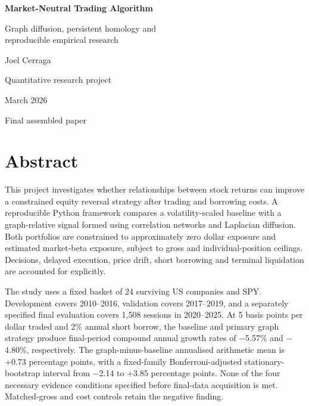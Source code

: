 \documentclass[12pt,a4paper,oneside]{article}
\begin{document}
\begin{titlepage}
\thispagestyle{empty}
\centering
\vspace*{28mm}
{\fontsize{24}{29}\selectfont\bfseries Market-Neutral Trading Algorithm\par}
\vspace{10mm}
{\fontsize{14}{19}\selectfont Graph diffusion, persistent homology and\\reproducible empirical research\par}
\vspace{24mm}
{\fontsize{12}{17}\selectfont Joel Cerraga\par}
\vspace{6mm}
{\fontsize{12}{17}\selectfont Quantitative research project\par}
\vspace{6mm}
{\fontsize{12}{17}\selectfont March 2026\par}
\vspace{6mm}
{\fontsize{11}{15}\selectfont Final assembled paper\par}
\vfill
\end{titlepage}
\thispagestyle{plain}
\section*{Abstract}
This project investigates whether relationships between stock returns can improve a constrained equity reversal strategy after trading and borrowing costs. A reproducible Python framework compares a volatility-scaled baseline with a graph-relative signal formed using correlation networks and Laplacian diffusion. Both portfolios are constrained to approximately zero dollar exposure and estimated market-beta exposure, subject to gross and individual-position ceilings. Decisions, delayed execution, price drift, short borrowing and terminal liquidation are accounted for explicitly.

The study uses a fixed basket of 24 surviving US companies and SPY. Development covers 2010–2016, validation covers 2017–2019, and a separately specified final evaluation covers 1,508 sessions in 2020–2025. At 5 basis points per dollar traded and 2\% annual short borrow, the baseline and primary graph strategy produce final-period compound annual growth rates of \( - \)5.57\% and \( - \)4.80\%, respectively. The graph-minus-baseline annualised arithmetic mean is +0.73 percentage points, with a fixed-family Bonferroni-adjusted stationary-bootstrap interval from \( - \)2.14 to +3.85 percentage points. None of the four necessary evidence conditions specified before final-data acquisition is met. Matched-gross and cost controls retain the negative finding.
\end{document}
